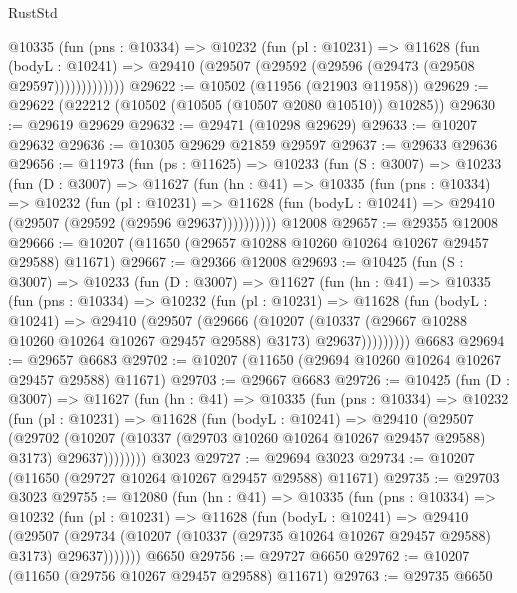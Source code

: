 \begin{lexlean}{RustStd}
\begin{coremodule}
            @10335
              (fun (pns : @10334) =>
              @10232
                (fun (pl : @10231) =>
                @11628
                  (fun (bodyL : @10241) =>
                  @29410 (@29507 (@29592 (@29596 (@29473 (@29508 @29597)))))))))))))
@29622 := @10502 (@11956 (@21903 @11958))
@29629 := @29622 (@22212 (@10502 (@10505 (@10507 @2080 @10510)) @10285))
@29630 := @29619 @29629
@29632 := @29471 (@10298 @29629)
@29633 := @10207 @29632
@29636 := @10305 @29629 @21859 @29597
@29637 := @29633 @29636
@29656 := @11973
    (fun (ps : @11625) =>
    @10233
      (fun (S : @3007) =>
      @10233
        (fun (D : @3007) =>
        @11627
          (fun (hn : @41) =>
          @10335
            (fun (pns : @10334) =>
            @10232
              (fun (pl : @10231) =>
              @11628 (fun (bodyL : @10241) => @29410 (@29507 (@29592 (@29596 @29637))))))))))
    @12008
@29657 := @29355 @12008
@29666 := @10207 (@11650 (@29657 @10288 @10260 @10264 @10267 @29457 @29588) @11671)
@29667 := @29366 @12008
@29693 := @10425
    (fun (S : @3007) =>
    @10233
      (fun (D : @3007) =>
      @11627
        (fun (hn : @41) =>
        @10335
          (fun (pns : @10334) =>
          @10232
            (fun (pl : @10231) =>
            @11628
              (fun (bodyL : @10241) =>
              @29410
                (@29507
                  (@29666
                    (@10207
                      (@10337 (@29667 @10288 @10260 @10264 @10267 @29457 @29588) @3173)
                      @29637)))))))))
    @6683
@29694 := @29657 @6683
@29702 := @10207 (@11650 (@29694 @10260 @10264 @10267 @29457 @29588) @11671)
@29703 := @29667 @6683
@29726 := @10425
    (fun (D : @3007) =>
    @11627
      (fun (hn : @41) =>
      @10335
        (fun (pns : @10334) =>
        @10232
          (fun (pl : @10231) =>
          @11628
            (fun (bodyL : @10241) =>
            @29410
              (@29507
                (@29702
                  (@10207 (@10337 (@29703 @10260 @10264 @10267 @29457 @29588) @3173) @29637))))))))
    @3023
@29727 := @29694 @3023
@29734 := @10207 (@11650 (@29727 @10264 @10267 @29457 @29588) @11671)
@29735 := @29703 @3023
@29755 := @12080
    (fun (hn : @41) =>
    @10335
      (fun (pns : @10334) =>
      @10232
        (fun (pl : @10231) =>
        @11628
          (fun (bodyL : @10241) =>
          @29410
            (@29507
              (@29734 (@10207 (@10337 (@29735 @10264 @10267 @29457 @29588) @3173) @29637)))))))
    @6650
@29756 := @29727 @6650
@29762 := @10207 (@11650 (@29756 @10267 @29457 @29588) @11671)
@29763 := @29735 @6650

\end{coremodule}
\end{lexlean}
